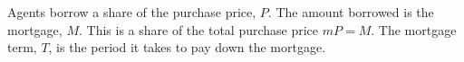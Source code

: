 { %
Agents borrow a share of the purchase price, $P$. The amount borrowed is the mortgage, $M$. This is a share of the total purchase price $mP = M$. The \gls{mortgage term}, $T$, is the period it takes to pay down the mortgage.





}
